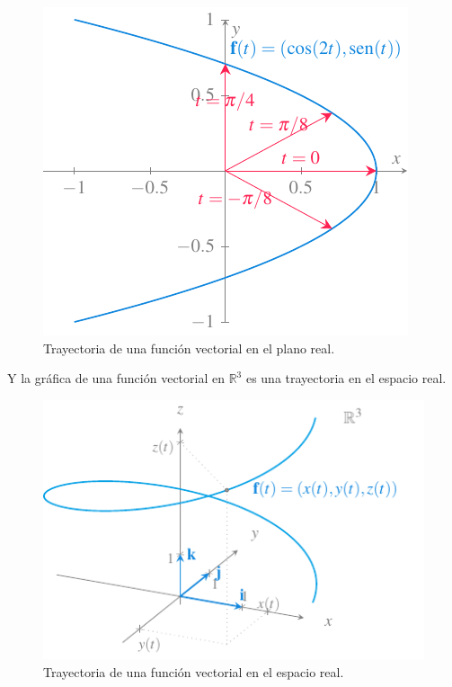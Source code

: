 \documentclass[
  a4paper,
]{scrreport}
\theoremstyle{definition}
\theoremstyle{plain}
\theoremstyle{definition}
\theoremstyle{definition}
\theoremstyle{plain}
\theoremstyle{plain}
\theoremstyle{remark}
\begin{document}
\begin{figure}[H]

{\centering \includegraphics{img/funciones-vectoriales/trayectoria-funcion-vectorial-plano.pdf}

}

\caption{Trayectoria de una función vectorial en el plano real.}

\end{figure}%

Y la gráfica de una función vectorial en \(\mathbb{R}^3\) es una
trayectoria en el espacio real.

\begin{figure}[H]

{\centering \includegraphics{img/funciones-vectoriales/trayectoria-espacio.pdf}

}

\caption{Trayectoria de una función vectorial en el espacio real.}

\end{figure}%
\end{document}

